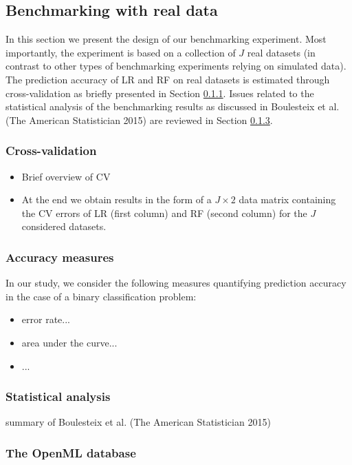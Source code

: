 \documentclass[12pt]{article}
\begin{document}
\subsection{Benchmarking with real data}
In this section we present the design of our benchmarking experiment. Most importantly, the experiment is based on a collection of $J$ real datasets (in contrast to other types of benchmarking experiments relying on simulated data). The prediction accuracy of LR and RF on real datasets is estimated through cross-validation as briefly presented in Section \ref{subsubsec:cv}. Issues related to the statistical analysis of the benchmarking results as discussed in Boulesteix et al. (The American Statistician 2015) are reviewed in Section \ref{subsubsec:stat}. 

\subsubsection{Cross-validation}
\label{subsubsec:cv}
\begin{itemize}
\item Brief overview of CV
\item At the end we obtain results in the form of a $J\times 2$ data matrix containing the CV errors of LR (first column) and RF (second column) for the $J$ considered datasets.
\end{itemize}

\subsubsection{Accuracy measures}
In our study, we consider the following measures quantifying prediction accuracy in the case of a binary classification problem:
\begin{itemize}
\item error rate...
\item area under the curve...
\item ...
\end{itemize}


\subsubsection{Statistical analysis}
\label{subsubsec:stat}
summary of Boulesteix et al. (The American Statistician 2015)


\subsubsection{The OpenML database}
\end{document}
